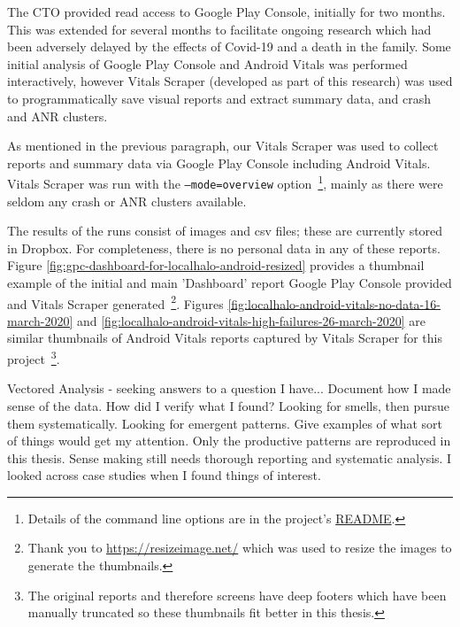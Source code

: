 
The CTO provided read access to Google Play Console, initially for two months. This was extended for several months to facilitate ongoing research which had been adversely delayed by the effects of Covid-19 and a death in the family. Some initial analysis of Google Play Console and Android Vitals was performed interactively, however Vitals Scraper (developed as part of this research) was used to programmatically save visual reports and extract summary data, and crash and ANR clusters.


As mentioned in the previous paragraph, our Vitals Scraper was used to collect reports and summary data via Google Play Console including Android Vitals. Vitals Scraper was run with the \texttt{--mode=overview} option~\footnote{Details of the command line options are in the project's \href{https://github.com/commercetest/vitals-scraper}{README}.}, mainly as there were seldom any crash or ANR clusters available.

The results of the runs consist of images and csv files; these are currently stored in Dropbox. For completeness, there is no personal data in any of these reports. Figure \ref{fig:gpc-dashboard-for-localhalo-android-resized} provides a thumbnail example of the initial and main 'Dashboard' report Google Play Console provided and Vitals Scraper generated~\footnote{Thank you to \url{https://resizeimage.net/} which was used to resize the images to generate the thumbnails.}. Figures \ref{fig:localhalo-android-vitals-no-data-16-march-2020} and \ref{fig:localhalo-android-vitals-high-failures-26-march-2020} are similar thumbnails of Android Vitals reports captured by Vitals Scraper for this project~\footnote{The original reports and therefore screens have deep footers which have been manually truncated so these thumbnails fit better in this thesis.}.


Vectored Analysis - seeking answers to a question I have...
Document how I made sense of the data. How did I verify what I found?
Looking for smells, then pursue them systematically. Looking for emergent patterns. Give examples of what sort of things would get my attention. Only the productive patterns are reproduced in this thesis. Sense making still needs thorough reporting and systematic analysis. I looked across case studies when I found things of interest.


